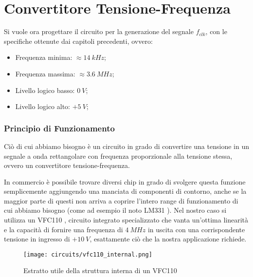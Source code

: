 \chapter{Convertitore Tensione-Frequenza}


Si vuole ora progettare il circuito per la generazione del segnale $f_{clk}$, con le
specifiche ottenute dai capitoli precedenti, ovvero:

\begin{itemize}
    \item Frequenza minima: $\approx 14\ kHz$;
    \item Frequenza massima: $\approx 3.6\ MHz$;
    \item Livello logico basso: $0\ V$;
    \item Livello logico alto: $+5\ V$;
\end{itemize}


\subsection*{Principio di Funzionamento}


Ciò di cui abbiamo bisogno è un circuito in grado di convertire una tensione in un segnale
a onda rettangolare con frequenza proporzionale alla tensione stessa, ovvero un convertitore
tensione-frequenza.

In commercio è possibile trovare diversi chip in grado di svolgere questa funzione
semplicemente aggiungendo una manciata di componenti di contorno, anche se la maggior
parte di questi non arriva a coprire l'intero range di funzionamento di cui abbiamo bisogno
(come ad esempio il noto LM331 \cite{lm331}). Nel nostro caso si utilizza un VFC110
\cite{vfc110}, circuito integrato specializzato che vanta un'ottima linearità e la capacità
di fornire una frequenza di $4\ MHz$ in uscita con una corrispondente tensione in ingresso
di $+10\ V$, esattamente ciò che la nostra applicazione richiede.

\begin{figure}[H]
    \centering
    \texttt{[image: circuits/vfc110\_internal.png]}
    \caption{Estratto utile della struttura interna di un VFC110}
    \label{vfc110_internal}
\end{figure}

